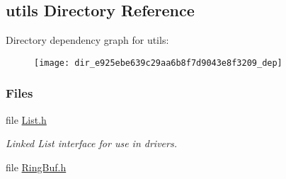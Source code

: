 \subsection{utils Directory Reference}
\label{dir_e925ebe639c29aa6b8f7d9043e8f3209}
Directory dependency graph for utils\+:
\nopagebreak
\begin{figure}[H]
\begin{center}
\leavevmode
\texttt{[image: dir\_e925ebe639c29aa6b8f7d9043e8f3209\_dep]}
\end{center}
\end{figure}
\subsubsection*{Files}
\begin{DoxyCompactItemize}
\item 
file \hyperlink{_list_8h}{List.\+h}
\begin{DoxyCompactList}\small\item\em Linked List interface for use in drivers. \end{DoxyCompactList}\item 
file \hyperlink{_ring_buf_8h}{Ring\+Buf.\+h}
\end{DoxyCompactItemize}

